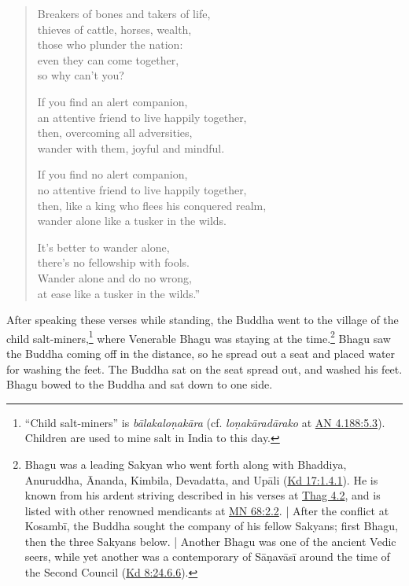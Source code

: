 \documentclass[12pt,openany]{book}%
\begin{document}
\begin{verse}
Breakers of bones and takers of life, \\
thieves of cattle, horses, wealth, \\
those who plunder the nation: \\
even they can come together, \\
so why can’t you? 

If you find an alert companion, \\
an attentive friend to live happily together, \\
then, overcoming all adversities, \\
wander with them, joyful and mindful. 

If you find no alert companion, \\
no attentive friend to live happily together, \\
then, like a king who flees his conquered realm, \\
wander alone like a tusker in the wilds. 

It’s better to wander alone, \\
there’s no fellowship with fools. \\
Wander alone and do no wrong, \\
at ease like a tusker in the wilds.” 

%
\end{verse}

After speaking these verses while standing, the Buddha went to the village of the child salt-miners,\footnote{“Child salt-miners” is \textit{\textsanskrit{bālakaloṇakāra}} (cf. \textit{\textsanskrit{loṇakāradārako}} at \href{https://suttacentral.net/an4.188/en/sujato\#5.3}{AN 4.188:5.3}). Children are used to mine salt in India to this day. } where Venerable Bhagu was staying at the time.\footnote{Bhagu was a leading Sakyan who went forth along with Bhaddiya, Anuruddha, Ānanda, Kimbila, Devadatta, and \textsanskrit{Upāli} (\href{https://suttacentral.net/pli-tv-kd17/en/sujato\#1.4.1}{Kd 17:1.4.1}). He is known from his ardent striving described in his verses at \href{https://suttacentral.net/thag4.2/en/sujato}{Thag 4.2}, and is listed with other renowned mendicants at \href{https://suttacentral.net/mn68/en/sujato\#2.2}{MN 68:2.2}. | After the conflict at \textsanskrit{Kosambī}, the Buddha sought the company of his fellow Sakyans; first Bhagu, then the three Sakyans below. | Another Bhagu was one of the ancient Vedic seers, while yet another was a contemporary of \textsanskrit{Sāṇavāsī} around the time of the Second Council (\href{https://suttacentral.net/pli-tv-kd8/en/sujato\#24.6.6}{Kd 8:24.6.6}). } Bhagu saw the Buddha coming off in the distance, so he spread out a seat and placed water for washing the feet. The Buddha sat on the seat spread out, and washed his feet. Bhagu bowed to the Buddha and sat down to one side. 
\end{document}
